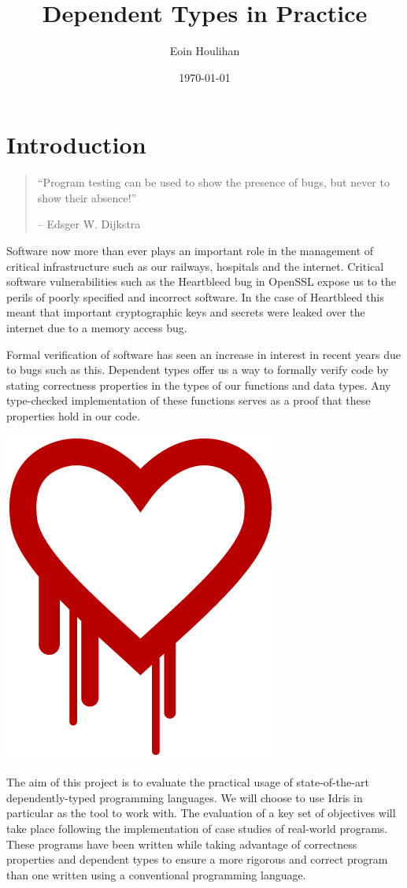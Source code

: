 \documentclass[a4paper, notitlepage]{report}
\author{Eoin Houlihan}
\date{\today}
\title{Dependent Types in Practice}
\begin{document}
\inserttitlepage
{}
\declaration
\permissiontolend
\insertabstract
\acknowledgements
\tableofcontents
\newpage
\pagestyle{headings}

\chapter{Introduction}
\label{sec:orgd1824ac}
\begin{quote}
``Program testing can be used to show the presence of bugs, but never to show
their absence!''

-- Edsger W. Dijkstra
\end{quote}

Software now more than ever plays an important role in the management of
critical infrastructure such as our railways, hospitals and the internet.
Critical software vulnerabilities such as the Heartbleed \cite{heartbleed_2014}
bug in OpenSSL expose us to the perils of poorly specified and incorrect
software. In the case of Heartbleed this meant that important cryptographic keys
and secrets were leaked over the internet due to a memory access bug.

Formal verification of software has seen an increase in interest in recent years
due to bugs such as this. Dependent types offer us a way to formally verify code
by stating correctness properties in the types of our functions and data types.
Any type-checked implementation of these functions serves as a proof that these
properties hold in our code.

\begin{center}
\includegraphics[width=0.35\linewidth]{./fig/heartbleed.png}
\end{center}

The aim of this project is to evaluate the practical usage of state-of-the-art
dependently-typed programming languages. We will choose to use Idris in
particular as the tool to work with. The evaluation of a key set of objectives
will take place following the implementation of case studies of real-world
programs. These programs have been written while taking advantage of correctness
properties and dependent types to ensure a more rigorous and correct program
than one written using a conventional programming language.
\end{document}
